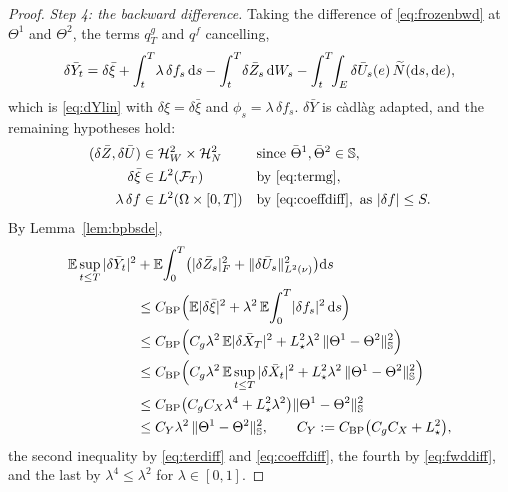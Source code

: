\begin{proof}
\emph{Step 4: the backward difference.} Taking the difference of \eqref{eq:frozenbwd} at
$\Theta^1$ and $\Theta^2$, the terms $q^g_T$ and $q^f$ cancelling,
\[
\delta\bar Y_t=\delta\bar\xi+\int_t^T\!\lambda\,\delta f_s\,\mathrm{d} s
-\int_t^T\!\delta\bar Z_s\,\mathrm{d} W_s-\int_t^T\!\!\int_E\delta\bar U_s(e)\,\widetilde{N}(\mathrm{d} s,\mathrm{d} e) ,
\]
which is \eqref{eq:dYlin} with $\delta\xi=\delta\bar\xi$ and $\phi_s=\lambda\,\delta f_s$.
$\delta\bar Y$ is c\`adl\`ag adapted, and the remaining hypotheses hold:
\[
\begin{alignedat}{2}
(\delta\bar Z,\delta\bar U)&\in\mathcal{H}^2_W\times\mathcal{H}^2_N
&\quad&\text{since }\bar\Theta^1,\bar\Theta^2\in\mathbb{S},\\
\delta\bar\xi&\in L^2(\mathcal{F}_T) &&\text{by }\eqref{eq:termg},\\
\lambda\,\delta f&\in L^2(\Omega\times[0,T]) &&\text{by }\eqref{eq:coeffdiff},
\text{ as }|\delta f|\le S.
\end{alignedat}
\]
By Lemma~\ref{lem:bpbsde},
\begin{equation}\label{eq:bwddiff}
\begin{aligned}
\mathbb{E}\sup_{t\le T}|\delta\bar Y_t|^2
&+\mathbb{E}\!\int_0^T\!\big(|\delta\bar Z_s|_F^2+\lVert \delta\bar U_s\rVert_{L^2(\nu)}^2\big)\mathrm{d} s\\
&\le C_{\mathrm{BP}}\Big(\mathbb{E}|\delta\bar\xi|^2+\lambda^2\,\mathbb{E}\!\int_0^T\!|\delta f_s|^2\,\mathrm{d} s\Big)\\
&\le C_{\mathrm{BP}}\Big(C_g\lambda^2\,\mathbb{E}|\delta\bar X_T|^2
+L_\star^2\lambda^2\,\|\Theta^1-\Theta^2\|_{\mathbb{S}}^2\Big)\\
&\le C_{\mathrm{BP}}\Big(C_g\lambda^2\,\mathbb{E}\sup_{t\le T}|\delta\bar X_t|^2
+L_\star^2\lambda^2\,\|\Theta^1-\Theta^2\|_{\mathbb{S}}^2\Big)\\
&\le C_{\mathrm{BP}}\big(C_gC_X\lambda^4+L_\star^2\lambda^2\big)\|\Theta^1-\Theta^2\|_{\mathbb{S}}^2\\
&\le C_Y\lambda^2\,\|\Theta^1-\Theta^2\|_{\mathbb{S}}^2 ,
\qquad C_Y:=C_{\mathrm{BP}}\big(C_gC_X+L_\star^2\big) ,
\end{aligned}
\end{equation}
the second inequality by \eqref{eq:terdiff} and \eqref{eq:coeffdiff}, the fourth by
\eqref{eq:fwddiff}, and the last by $\lambda^4\le\lambda^2$ for $\lambda\in[0,1]$.


\end{proof}
